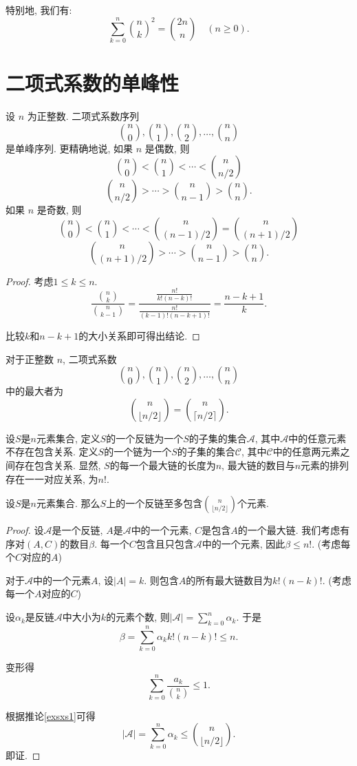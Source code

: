 特别地, 我们有: 
\[\sum_{k=0}^{n} \binom{n}{k}^2 = \binom{2n}{n} \quad (n \geqslant 0).  \]

\section{二项式系数的单峰性}
\begin{theorem}
    设 $n$ 为正整数.   二项式系数序列
    \[
        \binom{n}{0},  \binom{n}{1},  \binom{n}{2},  \ldots,  \binom{n}{n}
    \]
    是单峰序列.  更精确地说, 如果 $n$ 是偶数, 则
    \[
        \binom{n}{0} < \binom{n}{1} < \cdots < \binom{n}{n/2} \]\[
        \binom{n}{n/2} > \cdots > \binom{n}{n-1} > \binom{n}{n}.
    \]
    如果 $n$ 是奇数, 则
    \[
        \binom{n}{0} < \binom{n}{1} < \cdots < \binom{n}{(n-1)/2} = \binom{n}{(n+1)/2} \]\[
        \binom{n}{(n+1)/2} > \cdots > \binom{n}{n-1} > \binom{n}{n}.
    \]
\end{theorem}
\begin{proof}
    考虑\(1\leq k\leq n\).
    \[\frac{\binom{n}{k}}{\binom{n}{k-1}} = \frac{\frac{n!}{k!(n-k)!}}{\frac{n!}{(k-1)!(n-k+1)!}} = \frac{n-k+1}{k}.  \]

    比较\(k\)和\(n-k+1\)的大小关系即可得出结论.
\end{proof}
\begin{corollary}\label{exsxs1}
    对于正整数 $n$, 二项式系数
    \[
        \binom{n}{0},  \binom{n}{1},  \binom{n}{2},  \ldots,  \binom{n}{n}
    \]
    中的最大者为
    \[
        \binom{n}{\lfloor n/2 \rfloor} = \binom{n}{\lceil n/2 \rceil}.
    \]
\end{corollary}

设$S$是$n$元素集合, 定义$S$的一个反链为一个$S$的子集的集合$\mathcal{A}$, 其中$\mathcal{A}$中的任意元素不存在包含关系.   定义$S$的一个链为一个$S$的子集的集合$\mathcal{C}$, 其中$\mathcal{C}$中的任意两元素之间存在包含关系.   显然, $S$的每一个最大链的长度为$n$, 最大链的数目与$n$元素的排列存在一一对应关系, 为$n!$.

\begin{theorem}[Sperner定理]
    设$S$是$n$元素集合.   那么$S$上的一个反链至多包含$\binom{n}{\lfloor n/2 \rfloor}$个元素.
\end{theorem}
\begin{proof}
    设$\mathcal{A}$是一个反链, $A$是$\mathcal{A}$中的一个元素, $C$是包含$A$的一个最大链. 我们考虑有序对$(A,C)$的数目$\beta $. 每一个$C$包含且只包含$\mathcal{A}$中的一个元素, 因此$\beta \leq n!$. (考虑每个$C$对应的$A$)

    对于$\mathcal{A}$中的一个元素$A$, 设$|A|=k$. 则包含$A$的所有最大链数目为$k!(n-k)!$. (考虑每一个$A$对应的$C$)

    设$\alpha_k$是反链$\mathcal{A}$中大小为$k$的元素个数, 则$|\mathcal{A}|=\sum_{k=0}^{n}\alpha_k$. 于是
    $$\beta=\sum_{k=0}^{n}\alpha_k k!(n-k)!\leq n.$$

    变形得
    $$\sum_{k=0}^{n} \frac{a_k}{\binom{n}{k}} \leq 1.$$

    根据推论\ref{exsxs1}可得
    $$|\mathcal{A}|=\sum_{k=0}^{n}\alpha_k \leq\binom{n}{\lfloor n/2 \rfloor}.$$
    即证.
\end{proof}

